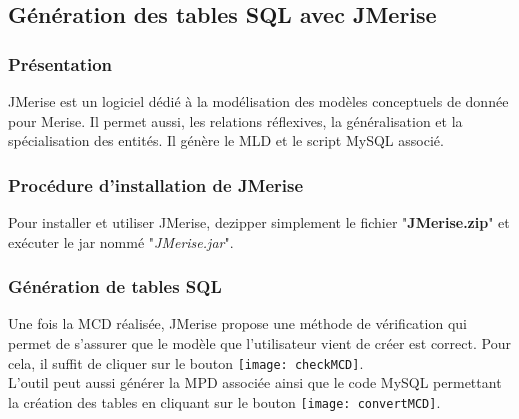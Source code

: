  \subsection{Génération des tables SQL avec JMerise}
 
 \subsubsection{Présentation}
JMerise est un logiciel dédié à la modélisation des modèles conceptuels de donnée pour Merise. Il permet aussi, les relations réflexives, la généralisation et la spécialisation des entités. Il génère le MLD et le script MySQL associé.

 \subsubsection{Procédure d'installation de JMerise}
Pour installer et utiliser JMerise, dezipper simplement le fichier "\textbf{JMerise.zip}" et exécuter le jar nommé "\textit{JMerise.jar}". 

 \subsubsection{Génération de tables SQL}
Une fois la MCD réalisée, JMerise propose une méthode de vérification qui permet de s'assurer que le modèle que l'utilisateur vient de créer est correct. Pour cela, il suffit de cliquer sur le bouton \texttt{[image: checkMCD]}.\\
L'outil peut aussi générer la MPD associée ainsi que le code MySQL permettant la création des tables en cliquant sur le bouton \texttt{[image: convertMCD]}.



